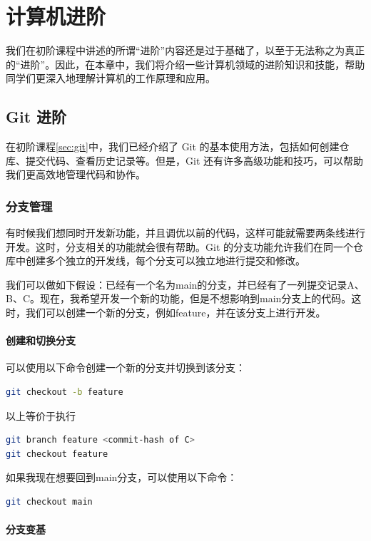 \documentclass[../main.tex]{subfiles}
\begin{document}
\chapter{计算机进阶}

我们在初阶课程中讲述的所谓“进阶”内容还是过于基础了，以至于无法称之为真正的“进阶”。因此，在本章中，我们将介绍一些计算机领域的进阶知识和技能，帮助同学们更深入地理解计算机的工作原理和应用。

\section{Git 进阶}\label{sec:git-advanced}

在初阶课程\ref{sec:git}中，我们已经介绍了 Git 的基本使用方法，包括如何创建仓库、提交代码、查看历史记录等。但是，Git 还有许多高级功能和技巧，可以帮助我们更高效地管理代码和协作。

\subsection{分支管理}

有时候我们想同时开发新功能，并且调优以前的代码，这样可能就需要两条线进行开发。这时，分支相关的功能就会很有帮助。Git 的分支功能允许我们在同一个仓库中创建多个独立的开发线，每个分支可以独立地进行提交和修改。

我们可以做如下假设：已经有一个名为main的分支，并已经有了一列提交记录A、B、C。现在，我希望开发一个新的功能，但是不想影响到main分支上的代码。这时，我们可以创建一个新的分支，例如feature，并在该分支上进行开发。

\subsubsection{创建和切换分支}

可以使用以下命令创建一个新的分支并切换到该分支：
\begin{lstlisting}[language=bash]
git checkout -b feature
\end{lstlisting}

以上等价于执行
\begin{lstlisting}[language=bash]
git branch feature <commit-hash of C>
git checkout feature
\end{lstlisting}

如果我现在想要回到main分支，可以使用以下命令：
\begin{lstlisting}[language=bash]
git checkout main
\end{lstlisting}

\subsubsection{分支变基}
\end{document}
